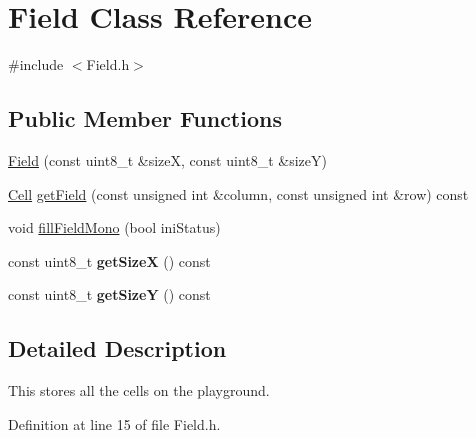 \hypertarget{classField}{\section{Field Class Reference}
\label{classField}
}


{\ttfamily \#include $<$Field.\-h$>$}

\subsection*{Public Member Functions}
\begin{DoxyCompactItemize}
\item 
\hyperlink{classField_a3732c7c2620b195e38610abdb48766ac}{Field} (const uint8\-\_\-t \&size\-X, const uint8\-\_\-t \&size\-Y)
\item 
\hyperlink{classCell}{Cell} \hyperlink{classField_a6b9088fd3fb3bd010eaa6133cf52ed18}{get\-Field} (const unsigned int \&column, const unsigned int \&row) const 
\item 
void \hyperlink{classField_aa3b7173cf7b034dec1318afbf1f5c291}{fill\-Field\-Mono} (bool ini\-Status)
\item 
\hypertarget{classField_a746054da9da8022a07fc13451c14965c}{const uint8\-\_\-t {\bfseries get\-Size\-X} () const }\label{classField_a746054da9da8022a07fc13451c14965c}

\item 
\hypertarget{classField_a0746b3584456b5f61248b48e9886d272}{const uint8\-\_\-t {\bfseries get\-Size\-Y} () const }\label{classField_a0746b3584456b5f61248b48e9886d272}

\end{DoxyCompactItemize}


\subsection{Detailed Description}
This stores all the cells on the playground. 

Definition at line 15 of file Field.\-h.




